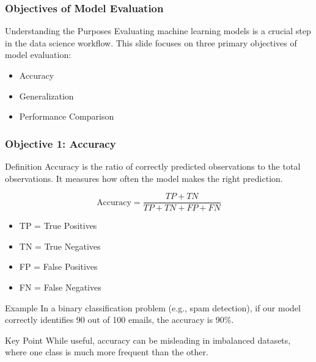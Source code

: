 \documentclass[aspectratio=169]{beamer}
\begin{document}
\begin{frame}[fragile]
    \frametitle{Objectives of Model Evaluation}
    
    \begin{block}{Understanding the Purposes}
        Evaluating machine learning models is a crucial step in the data science workflow. This slide focuses on three primary objectives of model evaluation:
        \begin{itemize}
            \item Accuracy
            \item Generalization
            \item Performance Comparison
        \end{itemize}
    \end{block}
\end{frame}

\begin{frame}[fragile]
    \frametitle{Objective 1: Accuracy}
    
    \begin{block}{Definition}
        Accuracy is the ratio of correctly predicted observations to the total observations. It measures how often the model makes the right prediction.
    \end{block}
    
    \begin{equation}
    \text{Accuracy} = \frac{TP + TN}{TP + TN + FP + FN}
    \end{equation}
    
    \begin{itemize}
        \item TP = True Positives
        \item TN = True Negatives
        \item FP = False Positives
        \item FN = False Negatives
    \end{itemize}

    \begin{block}{Example}
        In a binary classification problem (e.g., spam detection), if our model correctly identifies 90 out of 100 emails, the accuracy is 90\%.
    \end{block}
    
    \begin{block}{Key Point}
        While useful, accuracy can be misleading in imbalanced datasets, where one class is much more frequent than the other.
    \end{block}
\end{frame}
\end{document}
